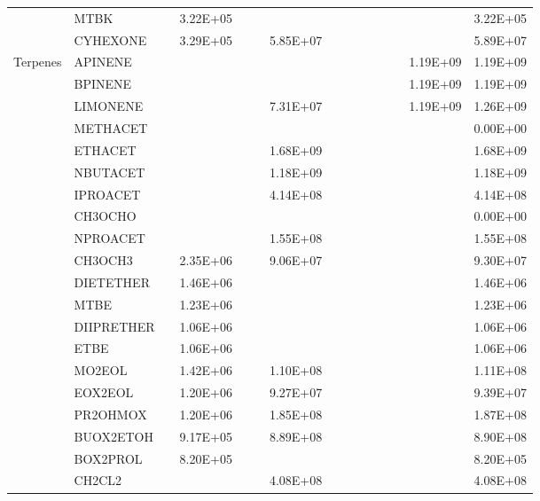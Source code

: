 \begin{longtable}{lllllllllllllll}
	 & MTBK &  & 3.22E+05 &  &  &  &  &  &  &  &  &  &  & 3.22E+05 \\
	 & CYHEXONE &  & 3.29E+05 &  &  & 5.85E+07 &  &  &  &  &  &  &  & 5.89E+07 \\
	\hline \multirow{3}{*}{Terpenes} & APINENE &  &  &  &  &  &  &  &  &  &  &  & 1.19E+09 & 1.19E+09 \\
	 & BPINENE &  &  &  &  &  &  &  &  &  &  &  & 1.19E+09 & 1.19E+09 \\
	 & LIMONENE &  &  &  &  & 7.31E+07 &  &  &  &  &  &  & 1.19E+09 & 1.26E+09 \\
	\hline \parbox[t]{2mm}{} & METHACET &  &  &  &  &  &  &  &  &  &  &  &  & 0.00E+00 \\
	 & ETHACET &  &  &  &  & 1.68E+09 &  &  &  &  &  &  &  & 1.68E+09 \\
	 & NBUTACET &  &  &  &  & 1.18E+09 &  &  &  &  &  &  &  & 1.18E+09 \\
	 & IPROACET &  &  &  &  & 4.14E+08 &  &  &  &  &  &  &  & 4.14E+08 \\
	 & CH3OCHO &  &  &  &  &  &  &  &  &  &  &  &  & 0.00E+00 \\
	 & NPROACET &  &  &  &  & 1.55E+08 &  &  &  &  &  &  &  & 1.55E+08 \\
	\hline \parbox[t]{2mm}{} & CH3OCH3 &  & 2.35E+06 &  &  & 9.06E+07 &  &  &  &  &  &  &  & 9.30E+07 \\*
	 & DIETETHER &  & 1.46E+06 &  &  &  &  &  &  &  &  &  &  & 1.46E+06 \\
	 & MTBE &  & 1.23E+06 &  &  &  &  &  &  &  &  &  &  & 1.23E+06 \\
	 & DIIPRETHER &  & 1.06E+06 &  &  &  &  &  &  &  &  &  &  & 1.06E+06 \\
	 & ETBE &  & 1.06E+06 &  &  &  &  &  &  &  &  &  &  & 1.06E+06 \\
	 & MO2EOL &  & 1.42E+06 &  &  & 1.10E+08 &  &  &  &  &  &  &  & 1.11E+08 \\
	 & EOX2EOL &  & 1.20E+06 &  &  & 9.27E+07 &  &  &  &  &  &  &  & 9.39E+07 \\
	 & PR2OHMOX &  & 1.20E+06 &  &  & 1.85E+08 &  &  &  &  &  &  &  & 1.87E+08 \\
	 & BUOX2ETOH &  & 9.17E+05 &  &  & 8.89E+08 &  &  &  &  &  &  &  & 8.90E+08 \\
	 & BOX2PROL &  & 8.20E+05 &  &  &  &  &  &  &  &  &  &  & 8.20E+05 \\
	\hline \parbox[t]{2mm}{} & CH2CL2 &  &  &  &  & 4.08E+08 &  &  &  &  &  &  &  & 4.08E+08 \\

\end{longtable}
